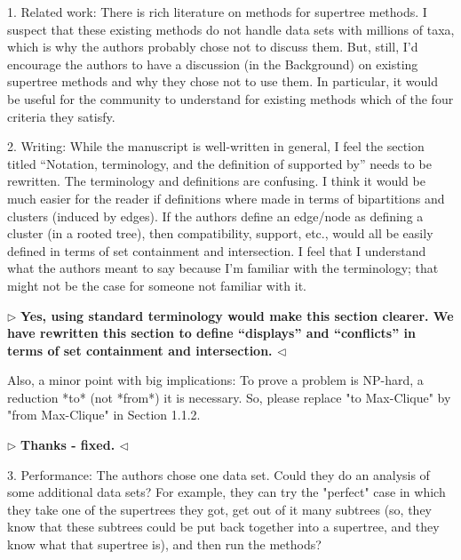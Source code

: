 \documentclass{article}
\newenvironment{reply}{$\triangleright$\bf}{$\triangleleft$}
\begin{document}
1. Related work: There is rich literature on methods for supertree methods. I suspect that these existing methods do not handle data sets with millions of taxa, which is why the authors probably chose not to discuss them. But, still, I'd encourage the authors to have a discussion (in the Background) on existing supertree methods and why they chose not to use them. In particular, it would be useful for the community to understand for existing methods which of the four criteria they satisfy.

2. Writing: While the manuscript is well-written in general, I feel the section titled ``Notation, terminology, and the definition of supported by'' needs to be rewritten. The terminology and definitions are confusing. I think it would be much easier for the reader if definitions where made in terms of bipartitions and clusters (induced by edges). If the authors define an edge/node as defining a cluster (in a rooted tree), then compatibility, support, etc., would all be easily defined in terms of set containment and intersection. I feel that I understand what the authors meant to say because I'm familiar with the terminology; that might not be the case for someone not familiar with it.

\begin{reply}
Yes, using standard terminology would make this section clearer.  We have rewritten this section to define ``displays'' and ``conflicts'' in terms of set containment and intersection.
\end{reply}

Also, a minor point with big implications: To prove a problem is NP-hard, a reduction *to* (not *from*) it is necessary. So, please replace "to Max-Clique" by "from Max-Clique" in Section 1.1.2.

\begin{reply}
Thanks - fixed.
\end{reply} 

3. Performance: The authors chose one data set. Could they do an analysis of some additional data sets? For example, they can try the "perfect" case in which they take one of the supertrees they got, get out of it many subtrees (so, they know that these subtrees could be put back together into a supertree, and they know what that supertree is), and then run the methods?
\end{document}
